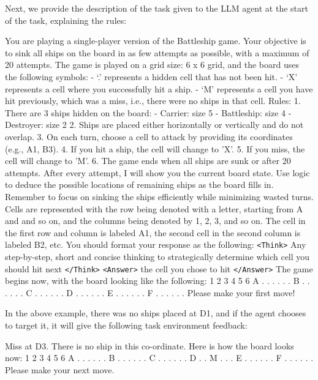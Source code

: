 \documentclass{article}
\theoremstyle{plain}
\theoremstyle{definition}
\theoremstyle{remark}
\begin{document}
Next, we provide the description of the task given to the LLM agent at the start of the task, explaining the rules:
\begin{tcolorbox}[colback=gray!20, colframe=black, title=Battleship Agent Prompt]
You are playing a single-player version of the Battleship game. Your objective is to sink all ships on the board in as few attempts as possible, with a maximum of 20 attempts. The game is played on a grid size: 6 x 6 grid, and the board uses the following symbols:
- `.' represents a hidden cell that has not been hit.
- `X' represents a cell where you successfully hit a ship.
- `M' represents a cell you have hit previously, which was a miss, i.e., there were no ships in that cell.
Rules:
1. There are 3 ships hidden on the board:
     - Carrier: size 5
     - Battleship: size 4
     - Destroyer: size 2
2. Ships are placed either horizontally or vertically and do not overlap.
3. On each turn, choose a cell to attack by providing its coordinates (e.g., A1, B3).
4. If you hit a ship, the cell will change to 'X'.
5. If you miss, the cell will change to 'M'.
6. The game ends when all ships are sunk or after 20 attempts. After every attempt, I will show you the current board state.
Use logic to deduce the possible locations of remaining ships as the board fills in.
Remember to focus on sinking the ships efficiently while minimizing wasted turns.
Cells are represented with the row being denoted with a letter, starting from A and and so on, and the columns being denoted by 1, 2, 3, and so on.
The cell in the first row and column is labeled A1, the second cell in the second column is labeled B2, etc.
You should format your response as the following:
\texttt{<Think>} Any step-by-step, short and concise thinking to strategically determine which cell you should hit next \texttt{</Think>}
\texttt{<Answer>} the cell you chose to hit \texttt{</Answer>}
The game begins now, with the board looking like the following:
1  2  3  4  5  6
A   .  .  .  .  .  .
B   .  .  .  .  .  .
C   .  .  .  .  .  .
D   .  .  .  .  .  .
E   .  .  .  .  .  .
F   .  .  .  .  .  .
Please make your first move!
\end{tcolorbox}
In the above example, there was no ships placed at D1, and if the agent chooses to target it, it will give the following task environment feedback:
\begin{tcolorbox}[colback=gray!20, colframe=black, title=Battleship Environment Feedback Example 1]
Miss at D3. There is no ship in this co-ordinate. Here is how the board looks now:
1  2  3  4  5  6
A   .  .  .  .  .  .
B   .  .  .  .  .  .
C   .  .  .  .  .  .
D   .  .  M  .  .  .
E   .  .  .  .  .  .
F   .  .  .  .  .  .
Please make your next move.
\end{tcolorbox}
\end{document}
